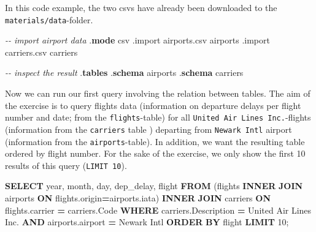 \documentclass[
  12pt,
]{style/krantz}
\newenvironment{Shaded}{\begin{snugshade}}{\end{snugshade}}
\newcommand{\CommentTok}[1]{\textcolor[rgb]{0.56,0.35,0.01}{\textit{#1}}}
\newcommand{\DataTypeTok}[1]{\textcolor[rgb]{0.13,0.29,0.53}{#1}}
\newcommand{\DecValTok}[1]{\textcolor[rgb]{0.00,0.00,0.81}{#1}}
\newcommand{\KeywordTok}[1]{\textcolor[rgb]{0.13,0.29,0.53}{\textbf{#1}}}
\newcommand{\NormalTok}[1]{#1}
\newcommand{\OperatorTok}[1]{\textcolor[rgb]{0.81,0.36,0.00}{\textbf{#1}}}
\newcommand{\StringTok}[1]{\textcolor[rgb]{0.31,0.60,0.02}{#1}}
\begin{document}
In this code example, the two csvs have already been downloaded to the \texttt{materials/data}-folder.

\begin{Shaded}
\begin{Highlighting}[]
\CommentTok{{-}{-} import airport data}
\NormalTok{.}\KeywordTok{mode}\NormalTok{ csv}
\NormalTok{.import airports.csv airports}
\NormalTok{.import carriers.csv carriers}

\CommentTok{{-}{-} inspect the result}
\NormalTok{.}\KeywordTok{tables}
\NormalTok{.}\KeywordTok{schema}\NormalTok{ airports}
\NormalTok{.}\KeywordTok{schema}\NormalTok{ carriers}
\end{Highlighting}
\end{Shaded}

Now we can run our first query involving the relation between tables. The aim of the exercise is to query flights data (information on departure delays per flight number and date; from the \texttt{flights}-table) for all \texttt{United\ Air\ Lines\ Inc.}-flights (information from the \texttt{carriers} table ) departing from \texttt{Newark\ Intl} airport (information from the \texttt{airports}-table). In addition, we want the resulting table ordered by flight number. For the sake of the exercise, we only show the first 10 results of this query (\texttt{LIMIT\ 10}).

\begin{Shaded}
\begin{Highlighting}[]
\KeywordTok{SELECT} 
\DataTypeTok{year}\NormalTok{,}
\DataTypeTok{month}\NormalTok{, }
\DataTypeTok{day}\NormalTok{,}
\NormalTok{dep\_delay,}
\NormalTok{flight}
\KeywordTok{FROM}\NormalTok{ (flights }\KeywordTok{INNER} \KeywordTok{JOIN}\NormalTok{ airports }\KeywordTok{ON}\NormalTok{ flights.origin}\OperatorTok{=}\NormalTok{airports.iata) }
\KeywordTok{INNER} \KeywordTok{JOIN}\NormalTok{ carriers }\KeywordTok{ON}\NormalTok{ flights.carrier }\OperatorTok{=}\NormalTok{ carriers.Code}
\KeywordTok{WHERE}\NormalTok{ carriers.Description }\OperatorTok{=} \StringTok{\textquotesingle{}United Air Lines Inc.\textquotesingle{}}
\KeywordTok{AND}\NormalTok{ airports.airport }\OperatorTok{=} \StringTok{\textquotesingle{}Newark Intl\textquotesingle{}}
\KeywordTok{ORDER} \KeywordTok{BY}\NormalTok{ flight}
\KeywordTok{LIMIT} \DecValTok{10}\NormalTok{;}
\end{Highlighting}
\end{Shaded}
\end{document}
